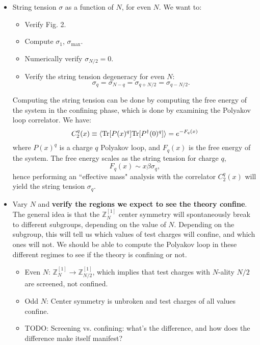 \begin{itemize}
	\item String tension $\sigma$ as a function of $N$, for even $N$. We want to:
	\begin{itemize}
		\item Verify Fig. 2.
		\item Compute $\sigma_1$, $\sigma_\mathrm{max}$.
		\item Numerically verify $\sigma_{N/2} = 0$. 
		\item Verify the string tension degeneracy for even $N$:
		\begin{equation}
			\sigma_q = \sigma_{N - q} = \sigma_{q + N/2} = \sigma_{q - N/2}.
		\end{equation}
	\end{itemize}
	Computing the string tension can be done by computing the free energy of the system in the confining phase, which is done by examining the Polyakov loop correlator. We have:
	\begin{equation}
		C^q_2(x) \equiv \langle \mathrm{Tr} [P(x)^q] \mathrm{Tr}[ P^\dagger(0)^q] \rangle = e^{-F_q(x)}
	\end{equation}
	where $P(x)^q$ is a charge $q$ Polyakov loop, and $F_q(x)$ is the free energy of the system. The free energy scales as the string tension for charge $q$,
	\begin{equation}
		F_q(x) \sim x \beta \sigma_q,
	\end{equation}
	hence performing an ``effective mass" analysis with the correlator $C_2^q(x)$ will yield the string tension $\sigma_q$. 
	
	\item Vary $N$ and \textbf{verify the regions we expect to see the theory confine}. The general idea is that the $\mathbb Z_N^{[1]}$ center symmetry will spontaneously break to different subgroups, depending on the value of $N$. Depending on the subgroup, this will tell us which values of test charges will confine, and which ones will not. We should be able to compute the Polyakov loop in these different regimes to see if the theory is confining or not. 
	\begin{itemize}
		\item Even $N$: $\mathbb Z_N^{[1]}\rightarrow \mathbb Z_{N/2}^{[1]}$, which implies that test charges with $N$-ality $N / 2$ are screened, not confined. 
		\item Odd $N$: Center symmetry is unbroken and test charges of all values confine. 
		\item TODO: Screening vs. confining: what's the difference, and how does the difference make itself manifest?
	\end{itemize}
	

\end{itemize}
